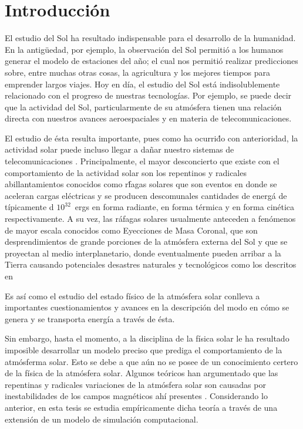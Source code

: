 \documentclass[9pt]{book}
\begin{document}
  \renewcommand{\thepage}{\arabic{page}}
  \setcounter{page}{1}
  \renewcommand{\tablename}{Tabla}

\frontmatter
\tableofcontents


\mainmatter
 \chapter{Introducci\'on}


El estudio del Sol ha resultado indispensable para el desarrollo de la humanidad. En la antig\"uedad, por ejemplo, la observaci\'on del Sol permiti\'o a los humanos generar el modelo de estaciones del a\~no; el cual nos permiti\'o realizar predicciones sobre, entre muchas otras cosas, la agricultura y los mejores tiempos para emprender largos viajes. Hoy en d\'ia, el estudio del Sol est\'a indisolublemente relacionado con el progreso de nuestras tecnolog\'ias. Por ejemplo, se puede decir que la actividad del Sol, particularmente de su atm\'osfera tienen una relaci\'on directa con nuestros avances aeroespaciales y en materia de telecomunicaciones.

El estudio de \'esta resulta importante, pues como ha ocurri\'do con anterioridad, la actividad solar puede incluso llegar a da\~nar nuestro sistemas de telecomunicaciones \cite{carrington}. Principalmente, el mayor desconcierto que existe con el comportamiento de la actividad solar son los repentinos y radicales abillantamientos conocidos como r\'fagas solares que son eventos en donde se aceleran cargas el\'ectricas y se producen descomunales cantidades de energ\'a de t\'ipicamente d $10^{32}$~ergs en forma radiante, en forma t\'ermica y en forma cin\'etica respectivamente. A su vez, las r\'afagas solares usualmente anteceden a fen\'omenos de mayor escala conocidos como Eyecciones de Masa Coronal, que son desprendimientos de grande porciones de la atm\'osfera externa del Sol y que se proyectan al medio interplanetario, donde eventualmente pueden arribar a la Tierra causando potenciales desastres naturales y tecnol\'ogicos como los descritos en~\cite{carrington}

Es as\'i como el estudio del estado f\'isico de la atm\'osfera solar conlleva a importantes cuestionamientos y avances en la descripci\'on del modo en c\'omo se genera y se transporta energ\'ia a trav\'es de \'esta.

Sin embargo, hasta el momento, a la disciplina de la f\'isica solar le ha resultado imposible desarrollar un modelo preciso que prediga el comportamiento de la atm\'osferma solar. Esto se debe a que a\'un no se posee de un conocimiento certero de la f\'isica de la atm\'osfera solar. Algunos te\'oricos han argumentado que las repentinas y radicales variaciones de la atm\'osfera solar son causadas por inestabilidades de los campos magn\'eticos ah\'i presentes \cite{chromotemp}. Considerando lo anterior, en esta tesis se estudia emp\'iricamente dicha teor\'ia a trav\'es de una extensi\'on de un modelo de simulaci\'on computacional.
\end{document}
